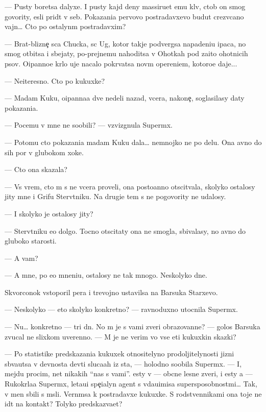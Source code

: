 \documentclass[12pt]{book}
\begin{document}
— Pusty boretsa dalyxe. I pusty kajd{\yi}{\y} deny massiru{\y}et {\y}emu kl{\io}v, ctob{\yi} on smog govority, {\y}esli prid{\e}t v seb{\ia}. Pokazani{\y}a pervovo postradavxevo budut crezv{\yi}ca{\y}no vajn{\yi}… Cto po ostalyn{\yi}m postradavxim?

— Brat-blizne{\c} s{\yi}ca Chucka, s{\yi}c Ug, kotor{\yi}{\y} takje podvergsa napadeni{\y}u {\X}ipaca, no smog otbitsa i sbejaty, po-prejnemu nahoditsa v Ohotkah pod za{\x}ito{\y} ohotnic{\y}ih psov. O{\x}ipanno{\y}e kr{\yi}lo uje nacalo pokr{\yi}vatsa nov{\yi}m opereni{\y}em, kotoro{\y}e daje...

— Neiteresno. Cto po kukuxke?

— Madam Kuku, o{\x}ipanna{\y}a dve nedeli nazad, vcera, na\-ko\-ne{\c}, soglasilasy daty pokazani{\y}a.

— Po\-ce\-mu v{\yi} mne ne soob{\x}ili? — vzvizgnula Superm{\yi}x.

— Potomu cto pokazani{\y}a madam Kuku dala… nemnojko ne po delu. Ona {\y}avno do sih por v glubokom xoke.

— Cto ona skazala?

— Vs{\e} vrem{\ia}, cto m{\yi} s ne{\y} vcera proveli, ona posto{\y}anno otscit{\yi}vala, skoly\-ko ostalosy jity mne i Grifu Sterv{\ia}tniku. Na drugi{\y}e tem{\yi} s ne{\y} po\-go\-vo\-rity ne udalosy.

— I skoly\-ko je ostalosy jity?

— Sterv{\ia}tniku {\y}e{\x}o dolgo. Tocno otscitaty ona ne smogla, sbivalasy, no {\y}avno do gluboko{\y} starosti.

— A vam?

— A mne, po {\y}e{\y}o mneni{\y}u, ostalosy ne tak mnogo. Neskolyko dne{\y}.

Skvorconok vstopor{\x}il per{\y}a i trevojno ustavilsa na Barsuka Starxevo.

— Neskolyko — eto skoly\-ko konkretno? — ravnoduxno utocnila Superm{\yi}x.

— Nu… konkretno — tri dn{\ia}. No m{\yi} je s vami zveri obrazovann{\yi}{\y}e? — golos Barsuka zvucal ne slixkom uverenno. — M{\yi} je ne verim vo vse eti kukuxkin{\yi} skazki?

— Po statistike predskazani{\y}a kukuxek otnositelyno prodoljitelynosti jizni sb{\yi}va{\y}utsa v dev{\ia}nosta dev{\ia}ti sluca{\y}ah iz sta, — holodno soob{\x}ila Superm{\yi}x. — I, mejdu procim, net nikakih ``nas s vami''. {\Y}esty v{\yi} — ob{\yi}cn{\yi}{\y}e lesn{\yi}{\y}e zveri, i {\y}esty {\y}a — Rukokr{\yi}la{\y}a Superm{\yi}x, leta{\y}u{\x}i{\y} spe{\c}ialyn{\yi}{\y} agent s v{\yi}\-da\-{\y}u\-{\x}i\-misa supersposobnost{\ia}mi… Tak, v{\yi} men{\ia} sbili s m{\yi}sli. Vern{\e}msa k postradavxe{\y} kukuxke. S rodstvennikami ona toje ne id{\e}t na kontakt? Tolyko predskaz{\yi}va{\y}et?
\end{document}

